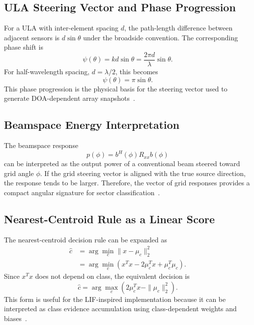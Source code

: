 \documentclass[11pt]{article}
\begin{document}
\subsection{ULA Steering Vector and Phase Progression}

For a ULA with inter-element spacing $d$, the path-length difference between adjacent sensors is $d\sin\theta$ under the broadside convention. The corresponding phase shift is
\begin{equation}
    \psi(\theta)=kd\sin\theta=\frac{2\pi d}{\lambda}\sin\theta.
\end{equation}
For half-wavelength spacing, $d=\lambda/2$, this becomes
\begin{equation}
    \psi(\theta)=\pi\sin\theta.
\end{equation}
This phase progression is the physical basis for the steering vector used to generate DOA-dependent array snapshots~\cite{vantrees2002optimum}.

\subsection{Beamspace Energy Interpretation}

The beamspace response
\begin{equation}
    p(\phi)=b^{H}(\phi)R_{xx}b(\phi)
\end{equation}
can be interpreted as the output power of a conventional beam steered toward grid angle $\phi$. If the grid steering vector is aligned with the true source direction, the response tends to be larger. Therefore, the vector of grid responses provides a compact angular signature for sector classification~\cite{vantrees2002optimum}.

\subsection{Nearest-Centroid Rule as a Linear Score}

The nearest-centroid decision rule can be expanded as
\begin{align}
    \hat{c}
    &=\arg\min_c \|x-\mu_c\|_2^2 \\
    &=\arg\min_c \left(x^Tx -2\mu_c^Tx + \mu_c^T\mu_c\right).
\end{align}
Since $x^Tx$ does not depend on class, the equivalent decision is
\begin{equation}
    \hat{c}=\arg\max_c \left(2\mu_c^Tx-\|\mu_c\|_2^2\right).
\end{equation}
This form is useful for the LIF-inspired implementation because it can be interpreted as class evidence accumulation using class-dependent weights and biases~\cite{duda2001pattern}.
\end{document}
